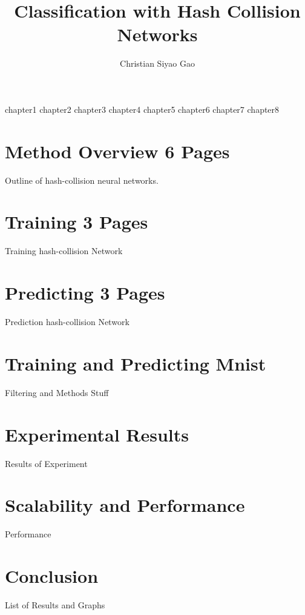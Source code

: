\documentclass [PhD] {uclathes}
\title          {Classification with Hash Collision Networks}
\author         {Christian Siyao Gao}
\begin{document}
\makeintropages


%
%
 {chapter1}                         %
 {chapter2}                         %
 {chapter3}                         %
 {chapter4}
 {chapter5}
 {chapter6}
 {chapter7}
 {chapter8}

\chapter{Method Overview 6 Pages}

Outline of hash-collision neural networks.

\chapter{Training 3 Pages}

Training hash-collision Network

\chapter{Predicting 3 Pages}

Prediction hash-collision Network

\chapter{Training and Predicting Mnist}

Filtering and Methods Stuff

\chapter{Experimental Results}

Results of Experiment

\chapter{Scalability and Performance}

Performance

\chapter{Conclusion}

List of Results and Graphs

\end{document}
